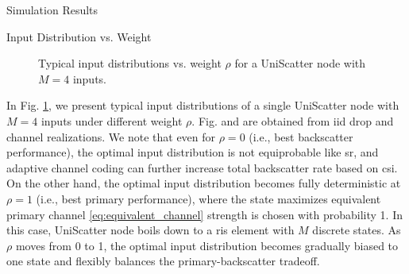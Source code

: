 \documentclass[journal]{IEEEtran}
\begin{document}
\begin{section}{Simulation Results}
	\begin{subsection}{Input Distribution vs. Weight}
		\begin{figure}[!t]
			\centering
			\caption{Typical input distributions vs. weight $\rho$ for a UniScatter node with $M=4$ inputs.}
			\label{fi:distribution_weights}
		\end{figure}
		In Fig. \ref{fi:distribution_weights}, we present typical input distributions of a single UniScatter node with $M=4$ inputs under different weight $\rho$.
		Fig.  and  are obtained from \gls{iid} drop and channel realizations.
		We note that even for $\rho=0$ (i.e., best backscatter performance), the optimal input distribution is not equiprobable like \gls{sr}, and adaptive channel coding can further increase total backscatter rate based on \gls{csi}.
		On the other hand, the optimal input distribution becomes fully deterministic at $\rho=1$ (i.e., best primary performance), where the state maximizes equivalent primary channel \eqref{eq:equivalent_channel} strength is chosen with probability \num{1}.
		In this case, UniScatter node boils down to a \gls{ris} element with $M$ discrete states.
		As $\rho$ moves from \num{0} to \num{1}, the optimal input distribution becomes gradually biased to one state and flexibly balances the primary-backscatter tradeoff.
	\end{subsection}


\end{section}
\end{document}
